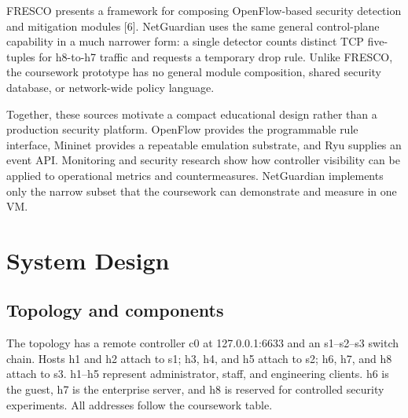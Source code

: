 \documentclass[conference]{IEEEtran}
\begin{document}
FRESCO presents a framework for composing OpenFlow-based security detection and mitigation modules [6]. NetGuardian uses the same general control-plane capability in a much narrower form: a single detector counts distinct TCP five-tuples for h8-to-h7 traffic and requests a temporary drop rule. Unlike FRESCO, the coursework prototype has no general module composition, shared security database, or network-wide policy language.

Together, these sources motivate a compact educational design rather than a production security platform. OpenFlow provides the programmable rule interface, Mininet provides a repeatable emulation substrate, and Ryu supplies an event API. Monitoring and security research show how controller visibility can be applied to operational metrics and countermeasures. NetGuardian implements only the narrow subset that the coursework can demonstrate and measure in one VM.

\section{System Design}
\subsection{Topology and components}
The topology has a remote controller c0 at 127.0.0.1:6633 and an s1--s2--s3 switch chain. Hosts h1 and h2 attach to s1; h3, h4, and h5 attach to s2; h6, h7, and h8 attach to s3. h1--h5 represent administrator, staff, and engineering clients. h6 is the guest, h7 is the enterprise server, and h8 is reserved for controlled security experiments. All addresses follow the coursework table.
\end{document}
